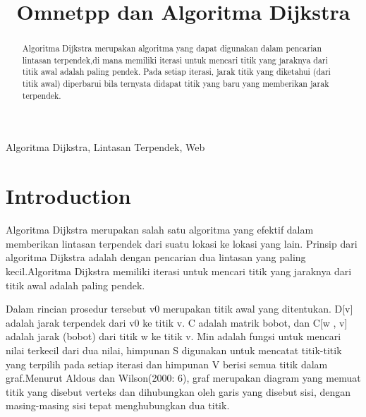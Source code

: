 \documentclass[conference]{IEEEtran}
\begin{document}
\title{Omnetpp dan Algoritma Dijkstra}

\author{
\and

\and
}
\maketitle

\begin{abstract}
    Algoritma Dijkstra merupakan algoritma yang dapat digunakan dalam
    pencarian lintasan terpendek,di mana memiliki iterasi untuk mencari titik yang jaraknya
    dari titik awal adalah paling pendek. Pada setiap iterasi, jarak titik yang diketahui (dari titik
    awal) diperbarui bila ternyata didapat titik yang baru yang memberikan jarak terpendek.
\end{abstract}

\begin{IEEEkeywords}
    Algoritma Dijkstra, Lintasan Terpendek, Web
\end{IEEEkeywords}

\section{Introduction}
Algoritma Dijkstra merupakan salah satu algoritma yang efektif dalam memberikan
lintasan terpendek dari suatu lokasi ke lokasi yang lain. Prinsip dari algoritma Dijkstra adalah
dengan pencarian dua lintasan yang paling kecil.Algoritma Dijkstra memiliki iterasi untuk
mencari titik yang jaraknya dari titik awal adalah paling pendek.

Dalam rincian prosedur tersebut v0 merupakan titik awal yang ditentukan. D[v] adalah
jarak terpendek dari v0 ke titik v. C adalah matrik bobot, dan C[w , v] adalah jarak (bobot) dari
titik w ke titik v. Min adalah fungsi untuk mencari nilai terkecil dari dua nilai, himpunan S
digunakan untuk mencatat titik-titik yang terpilih pada setiap iterasi dan himpunan V berisi
semua titik dalam graf.Menurut Aldous dan Wilson(2000: 6), graf merupakan diagram yang
memuat titik yang disebut verteks dan dihubungkan oleh garis yang disebut sisi, dengan
masing-masing sisi tepat menghubungkan dua titik. 
\end{document}
